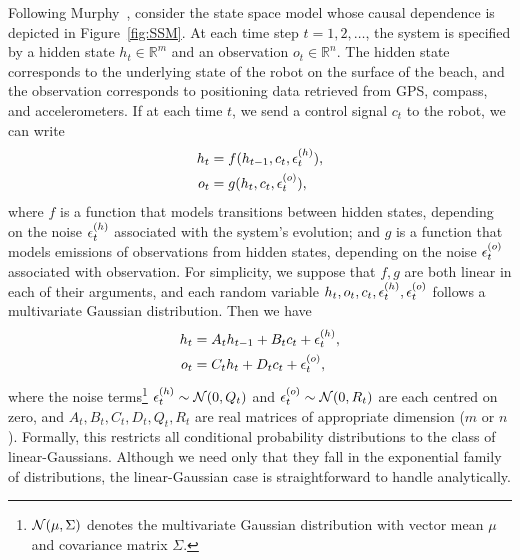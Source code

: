         Following Murphy~\cite{murphy}, consider the state space model whose causal dependence is depicted in Figure~\ref{fig:SSM}.
        At each time step $t = 1, 2, \ldots$, the system is specified by a hidden state $h_t \in \mathbb{R}^{m}$ and an observation $o_t \in \mathbb{R}^{n}$.
        The hidden state corresponds to the underlying state of the robot on the surface of the beach, and the observation corresponds to positioning data retrieved from GPS, compass, and accelerometers.
        If at each time $t$, we send a control signal $c_t$ to the robot, we can write
        \begin{align}
            h_t &= f(h_{t-1}, c_t, \epsilon^{(h)}_t), \\
            o_t &= g(h_{t}, c_t, \epsilon^{(o)}_t),
        \end{align}
        where $f$ is a function that models transitions between hidden states, depending on the noise $\epsilon^{(h)}_t$ associated with the system's evolution; and $g$ is a function that models emissions of observations from hidden states, depending on the noise $\epsilon^{(o)}_t$ associated with observation.
        For simplicity, we suppose that $f,g$ are both linear in each of their arguments, and each random variable $h_t, o_t, c_t, \epsilon^{(h)}_t, \epsilon^{(o)}_t$ follows a multivariate Gaussian distribution.
        Then we have
        \begin{align}
            h_t &= A_t h_{t-1} + B_t c_t + \epsilon^{(h)}_t, \\
            o_t &= C_t h_{t} + D_t c_t + \epsilon^{(o)}_t,
        \end{align}
        where the noise terms\footnote{$\mathcal{N}(\mu, \Sigma)$ denotes the multivariate Gaussian distribution with vector mean $\mu$ and covariance matrix $\Sigma$.} $\epsilon^{(h)}_t \sim \mathcal{N}(0, Q_t)$ and $\epsilon^{(o)}_t \sim \mathcal{N}(0, R_t)$ are each centred on zero, and $A_t, B_t, C_t, D_t, Q_t, R_t$ are real matrices of appropriate dimension ($m$ or $n$).
        Formally, this restricts all conditional probability distributions to the class of linear-Gaussians.
        Although we need only that they fall in the exponential family of distributions, the linear-Gaussian case is straightforward to handle analytically.

